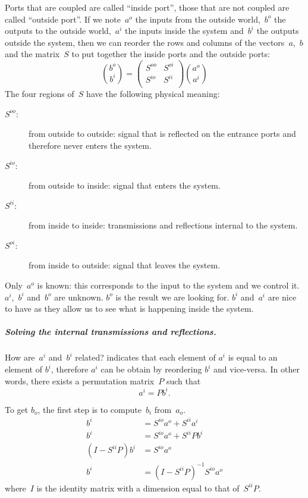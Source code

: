 Ports that are coupled are called ``inside port'', those that are not coupled are called ``outside port''.
If we note~$a^o$ the inputs from the outside world,~$b^o$ the outputs to the outside world,~$a^i$ the inputs inside the system and~$b^i$ the outputs outside the system, then we can reorder the rows and columns of the vectors~$a$,~$b$ and the matrix~$S$ to put together the inside ports and the outside ports: 
\begin{equation}
    \binom{b^o}{b^i} =
    \begin{pmatrix}
        S^{oo} & S^{oi} \\
        S^{io} & S^{ii} \\
    \end{pmatrix}
    \binom{a^o}{a^i}
    \label{eq:s_outside_inside}
\end{equation}
The four regions of~$S$ have the following physical meaning:
\begin{description}
    \item[$S^{oo}$:] from outside to outside: signal that is reflected on the entrance ports and therefore never enters the system.
    \item[$S^{io}$:] from outside to inside: signal that enters the system.
    \item[$S^{ii}$:] from inside to inside: transmissions and reflections internal to the system.
    \item[$S^{oi}$:] from inside to outside: signal that leaves the system.
\end{description}
Only~$a^o$ is known: this corresponds to the input to the system and we control it.
$a^i$,~$b^i$ and~$b^o$ are unknown.
$b^o$ is the result we are looking for.
$b^i$ and~$a^i$ are nice to have as they allow us to see what is happening inside the system.

\subparagraph{Solving the internal transmissions and reflections.}
How are~$a^i$ and~$b^i$ related?
 indicates that each element of $a^i$ is equal to an element of $b^i$, therefore $a^i$ can be obtain by reordering $b^i$ and vice-versa.
In other words, there exists a permutation matrix~$P$ such that
\begin{equation}
    a^i = P b^i \text{.} \label{eq:relation_ai_bi}
\end{equation}

To get $b_o$, the first step is to compute~$b_i$ from~$a_o$.
\begin{subequations}
    \begin{align}
        b^i &= S^{io}a^o + S^{ii}a^i \label{eq:compute_bi_ai} \\
        b^i &= S^{io}a^o + S^{ii}Pb^i \label{eq:compute_bi_bi} \\
        (I - S^{ii}P)b^i &= S^{io}a^o \label{eq:compute_bi_solve} \\
        b^i &= (I - S^{ii}P)^{-1} S^{io}a^o \label{eq:compute_bi_invert}
    \end{align} \label{eq:compute_bi}
\end{subequations}
where~$I$ is the identity matrix with a dimension equal to that of~$S^{ii}P$.

